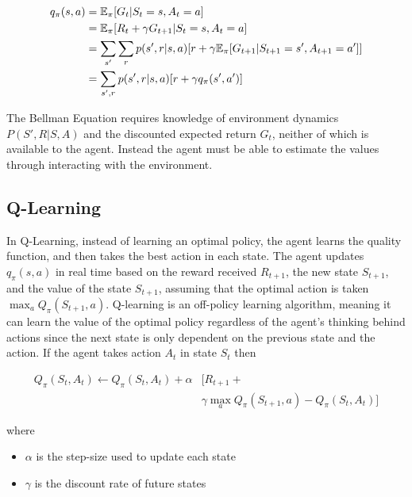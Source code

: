 \documentclass{article}
\begin{document}
\begin{align}
q_\pi(s,a) &= \mathbb{E}_\pi[G_t|S_t = s,A_t = a] \label{eq:qlearning1} \\
&= \mathbb{E}_\pi[R_t + \gamma G_{t+1} | S_t = s, A_t = a] \notag \\
&= \sum_{s'}\sum_{r}p(s',r|s,a)[r + \gamma\mathbb{E}_\pi[G_{t+1}|S_{t+1} = s', A_{t+1} = a']] \notag \\
&= \sum_{s',r}p(s',r|s,a)[r + \gamma q_\pi(s',a')] \notag
\end{align}

The Bellman Equation requires knowledge of environment dynamics $P(S',R | S,A)$ and the discounted expected return $G_t$, neither of which is available to the agent. Instead the agent must be able to estimate the values through interacting with the environment.

\subsection{Q-Learning}
In Q-Learning, instead of learning an optimal policy, the agent learns the quality function, and then takes the best action in each state. The agent updates $q_\pi(s,a)$ in real time based on the reward received $R_{t+1}$, the new state $S_{t+1}$, and the value of the state $S_{t+1}$,  assuming that the optimal action is taken $\max_aQ_\pi(S_{t+1}, a)$. Q-learning is an off-policy learning algorithm, meaning it can learn the value of the optimal policy regardless of the agent's thinking behind actions since the next state is only dependent on the previous state and the action. If the agent takes action $A_t$ in state $S_t$ then

\begin{equation} \label{eq:qupdate}
\begin{split}
Q_\pi(S_t,A_t) \leftarrow Q_\pi(S_t,A_t) + \alpha&[R_{t+1} + \\
&\gamma\max_aQ_\pi(S_{t+1},a) - Q_\pi(S_t,A_t)]
\end{split}
\end{equation}

where
\begin{itemize}
    \item $\alpha$ is the step-size used to update each state
    \item $\gamma$ is the discount rate of future states
\end{itemize}

\end{document}
